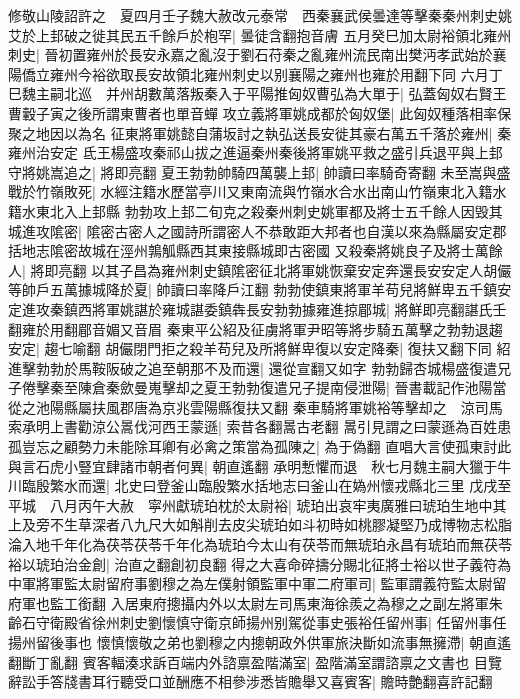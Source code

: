 修敬山陵詔許之　夏四月壬子魏大赦改元泰常　西秦襄武侯曇達等擊秦秦州刺史姚艾於上邽破之徙其民五千餘戶於枹罕|{
	曇徒含翻抱音膚}
五月癸巳加太尉裕領北雍州刺史|{
	晉初置雍州於長安永嘉之亂沒于劉石苻秦之亂雍州流民南出樊沔孝武始於襄陽僑立雍州今裕欲取長安故領北雍州刺史以别襄陽之雍州也雍於用翻下同}
六月丁巳魏主嗣北巡　并州胡數萬落叛秦入于平陽推匈奴曹弘為大單于|{
	弘蓋匈奴右賢王曹轂子寅之後所謂東曹者也單音蟬}
攻立義將軍姚成都於匈奴堡|{
	此匈奴種落相率保聚之地因以為名}
征東將軍姚懿自蒲坂討之執弘送長安徙其豪右萬五千落於雍州|{
	秦雍州治安定}
氐王楊盛攻秦祁山拔之進逼秦州秦後將軍姚平救之盛引兵退平與上邽守將姚嵩追之|{
	將即亮翻}
夏王勃勃帥騎四萬襲上邽|{
	帥讀曰率騎奇寄翻}
未至嵩與盛戰於竹嶺敗死|{
	水經注籍水歷當亭川又東南流與竹嶺水合水出南山竹嶺東北入籍水籍水東北入上邽縣}
勃勃攻上邽二旬克之殺秦州刺史姚軍都及將士五千餘人因毁其城進攻隂密|{
	隂密古密人之國詩所謂密人不恭敢距大邦者也自漢以來為縣屬安定郡括地志隂密故城在涇州鶉觚縣西其東接縣城即古密國}
又殺秦將姚良子及將士萬餘人|{
	將即亮翻}
以其子昌為雍州刺史鎮隂密征北將軍姚恢棄安定奔還長安安定人胡儼等帥戶五萬據城降於夏|{
	帥讀曰率降戶江翻}
勃勃使鎮東將軍羊苟兒將鮮卑五千鎮安定進攻秦鎮西將軍姚諶於雍城諶委鎮犇長安勃勃據雍進掠郿城|{
	將鮮即亮翻諶氏壬翻雍於用翻郿音媚又音眉}
秦東平公紹及征虜將軍尹昭等將步騎五萬擊之勃勃退趨安定|{
	趨七喻翻}
胡儼閉門拒之殺羊苟兒及所將鮮卑復以安定降秦|{
	復扶又翻下同}
紹進擊勃勃於馬鞍阪破之追至朝那不及而還|{
	還從宣翻又如字}
勃勃歸杏城楊盛復遣兄子倦擊秦至陳倉秦歛曼嵬擊却之夏王勃勃復遣兄子提南侵泄陽|{
	晉書載記作池陽當從之池陽縣屬扶風郡唐為京兆雲陽縣復扶又翻}
秦車騎將軍姚裕等擊却之　涼司馬索承明上書勸涼公暠伐河西王蒙遜|{
	索昔各翻暠古老翻}
暠引見謂之曰蒙遜為百姓患孤豈忘之顧勢力未能除耳卿有必禽之策當為孤陳之|{
	為于偽翻}
直唱大言使孤東討此與言石虎小豎宜肆諸市朝者何異|{
	朝直遙翻}
承明慙懼而退　秋七月魏主嗣大獵于牛川臨殷繁水而還|{
	北史曰登釜山臨殷繁水括地志曰釜山在媯州懷戎縣北三里}
戊戌至平城　八月丙午大赦　寜州獻琥珀枕於太尉裕|{
	琥珀出哀牢夷廣雅曰琥珀生地中其上及旁不生草深者八九尺大如斛削去皮尖琥珀如斗初時如桃膠凝堅乃成博物志松脂淪入地千年化為茯苓茯苓千年化為琥珀今太山有茯苓而無琥珀永昌有琥珀而無茯苓}
裕以琥珀治金創|{
	治直之翻創初良翻}
得之大喜命碎擣分賜北征將士裕以世子義符為中軍將軍監太尉留府事劉穆之為左僕射領監軍中軍二府軍司|{
	監軍謂義符監太尉留府軍也監工銜翻}
入居東府摠攝内外以太尉左司馬東海徐羨之為穆之之副左將軍朱齡石守衛殿省徐州刺史劉懷慎守衛京師揚州别駕從事史張裕任留州事|{
	任留州事任揚州留後事也}
懷慎懷敬之弟也劉穆之内摠朝政外供軍旅決斷如流事無擁滯|{
	朝直遙翻斷丁亂翻}
賓客輻湊求訴百端内外諮禀盈階滿室|{
	盈階滿室謂諮禀之文書也}
目覽辭訟手答牋書耳行聽受口並酬應不相參涉悉皆贍舉又喜賓客|{
	贍時艶翻喜許記翻}
